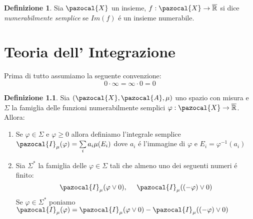 \documentclass[11pt,a4paper]{report}
\theoremstyle{plain}
\theoremstyle{definition}
\newtheorem{defn}[thm]{Definizione} %
\newcommand{\X}{\pazocal{X}}
\newcommand{\I}{\pazocal{I}}
\newcommand{\A}{\pazocal{A}}
\begin{document}
\begin{defn}
	Sia $\X$ un insieme, $f : \X \rightarrow \overline{\mathbb{R}}$ si dice \textit{numerabilmente semplice} se $Im(f)$ \'e un insieme numerabile.
\end{defn}

\chapter{Teoria dell' Integrazione}

Prima di tutto assumiamo la seguente convenzione:
\[
	0\cdot \infty = \infty \cdot 0 = 0
\]

\begin{defn}
	Sia $(\X,\A,\mu)$ uno spazio con misura e $\Sigma$ la famiglia delle funzioni numerabilmente semplici $\varphi : \X \rightarrow \overline{\mathbb{R}}$. Allora:
	\begin{enumerate}
		\item Se $\varphi \in \Sigma$ e $\varphi \ge 0$ allora definiamo l'integrale semplice $\I_\mu(\varphi) = \sum\limits_ia_i\mu(E_i)$ dove $a_i$ \'e  l'immagine di $\varphi$ e $E_i = \varphi^{-1}(a_i)$
		\item Sia $\Sigma^*$ la famiglia delle $\varphi \in \Sigma$ tali che almeno uno dei seguenti numeri \'e finito:
		\[
			\I_\mu(\varphi \vee 0),\ \ \ \ \I_\mu((-\varphi) \vee 0)		
		\]
		Se $\varphi \in \Sigma^*$ poniamo $\I_\mu(\varphi) = \I_\mu(\varphi \vee 0) - \I_\mu((-\varphi) \vee 0)$
	\end{enumerate}
\end{defn}
\end{document}
